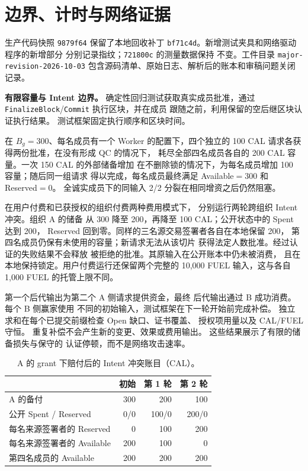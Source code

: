 \section{边界、计时与网络证据}
\label{supp:major-revision}
生产代码快照 \texttt{9879f64} 保留了本地回收补丁
\texttt{bf71c4d}。新增测试夹具和网络驱动程序的新增部分
分别记录指纹；\texttt{721800c} 的测量数据保持
不变。工件目录 \texttt{major-revision-2026-10-03}
包含源码清单、原始日志、解析后的账本和审稿问题关闭记录。

\noindent\textbf{有限容量与 Intent 边界。}
确定性回归测试获取真实成员批准，通过
\texttt{FinalizeBlock}/\texttt{Commit} 执行区块，并在成员
跟随之前，利用保留的空后继区块认证执行结果。
测试框架固定执行顺序和区块时间。

在 $B_g=300$、每名成员有一个 Worker 的配置下，四个独立的
100 CAL 请求各获得两份批准，在没有形成 QC 的情况下，
耗尽全部四名成员各自的 200 CAL 容量。一次 150 CAL 的外部储备增加
在不删除锁的情况下，为每名成员增加 100 容量；随后同一组请求
得以完成，每名成员最终满足 Available$=300$ 和 Reserved$=0$。
全诚实成员下的同输入 2/2 分裂在相同增资之后仍然阻塞。

在用户付费和已获授权的组织付费两种费用模式下，
分别运行两轮跨组织 Intent 冲突。组织 A 的储备
从 300 降至 200，再降至 100 CAL；公开状态中的 Spent 达到 200，
Reserved 回到零。同样的三名源交易签署者各自在本地保留 200，
第四名成员仍保有未使用的容量；新请求无法从该切片
获得法定人数批准。经过认证的失败结果不会释放
被拒绝的批准。其原输入在公开账本中仍未被消费，
且在本地保持锁定。用户付费运行还保留两个完整的
10,000 FUEL 输入，这与各自 1,000 FUEL 的托管上限不同。

第一个后代输出为第二个 A 侧请求提供资金，最终
后代输出通过 B 成功消费。每个 B 侧赢家使用
不同的初始输入，测试框架在下一轮开始前完成补偿。
独立求和在每个已提交前缀检查 Open 缺口、证书覆盖、
授权项用量以及 CAL/FUEL 守恒。
重复补偿不会产生新的变更、效果或费用输出。
这些结果展示了有限的储备损失与保守的
认证停顿，而不是网络攻击速率。


\begin{table}[!t]
\caption{A 的 grant 下赔付后的 Intent 冲突账目（CAL）。}
\label{tab:s3-ledger}
\centering\small
\begin{tabular}{@{}lrrr@{}}
\toprule
 & 初始 & 第 1 轮 & 第 2 轮 \\
\midrule
A 的备付 & 300 & 200 & 100 \\
公开 Spent / Reserved & 0/0 & 100/0 & 200/0 \\
每名来源签署者的 Reserved & 0 & 100 & 200 \\
每名来源签署者的 Available & 200 & 100 & 0 \\
第四名成员的 Available & 200 & 200 & 200 \\
\bottomrule
\end{tabular}
\end{table}

